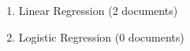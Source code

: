 \documentclass{article}
\begin{document}
\begin{enumerate}
    \item Linear Regression (2 documents)
    \item Logistic Regression (0 documents)
\end{enumerate}
\end{document}
